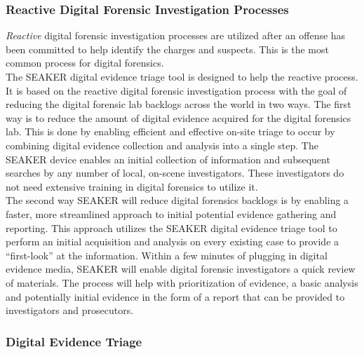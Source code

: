 \documentclass[12pt]{article}
\begin{document}
\subsubsection{Reactive Digital Forensic Investigation Processes}

\textit{Reactive} digital forensic investigation processes are utilized after an offense has been committed to help
identify the charges and suspects.  This is the most common process for digital forensics.\\

The SEAKER digital evidence triage tool is designed to help the reactive process.  
It is based on the reactive digital forensic investigation process with the goal of reducing the digital
forensic lab backlogs across the world in two ways.  The first way is to reduce the amount of digital
evidence acquired for the digital forensics lab.  This is done by enabling efficient and effective on-site triage to occur by
combining digital evidence collection and analysis into a single step.  The SEAKER device enables an initial 
collection of information and subsequent searches by any number of local,
on-scene investigators.  These investigators do not need extensive training in digital forensics to utilize it.\\

The second way SEAKER will reduce digital forensics backlogs is by enabling a faster, more streamlined approach to initial
potential evidence gathering and reporting.  This approach utilizes the SEAKER digital evidence triage tool to 
perform an initial acquisition and analysis on every existing case to provide a ``first-look'' at the information.
Within a few minutes of plugging in digital evidence media, SEAKER will enable digital 
forensic investigators a quick review of materials.  The process will help with prioritization of evidence, a basic
analysis and potentially initial evidence in the form of a report that can be provided to investigators and
prosecutors.\\

\subsubsection{Digital Evidence Triage}
\end{document}
